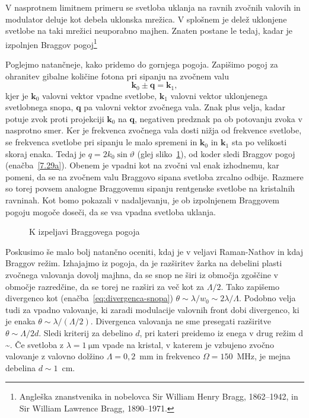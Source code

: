 V nasprotnem limitnem primeru se svetloba uklanja na ravnih zvočnih valovih in modulator deluje 
kot debela uklonska mrežica. V splošnem je delež uklonjene svetlobe na taki mrežici 
neuporabno majhen. 
Znaten postane le tedaj, kadar je izpolnjen Braggov
pogoj\footnote{Angleška znanstvenika in nobelovca Sir William Henry Bragg, 1862--1942,
in Sir William Lawrence Bragg, 1890--1971.}

Poglejmo natančneje, kako pridemo do gornjega pogoja. Zapišimo pogoj
za ohranitev gibalne količine fotona pri sipanju na zvočnem valu
\begin{equation}
\mathbf{k}_{0}\pm\mathbf{q}=\mathbf{k}_{1},
\label{7.30}
\end{equation}
kjer je $\mathbf{k}_{0}$ valovni vektor vpadne svetlobe, $\mathbf{k}_{1}$
valovni vektor uklonjenega svetlobnega snopa, $\mathbf{q}$ pa valovni
vektor zvočnega vala. Znak plus velja, kadar potuje zvok proti projekciji
$\mathbf{k}_{0}$ na $\mathbf{q}$, negativen predznak pa ob potovanju zvoka v nasprotno smer. 
Ker je frekvenca zvočnega vala dosti nižja od frekvence svetlobe, se frekvenca svetlobe 
pri sipanju le malo spremeni in $\mathbf{k}_{0}$ in $\mathbf{k}_{1}$ sta po velikosti skoraj enaka.
Tedaj je $q=2k_{0}\sin\vartheta$ (glej sliko~\ref{fig:ao_bragg3}), od koder sledi Braggov pogoj 
(enačba~\ref{7.29a}). Obenem je vpadni kot na zvočni val enak izhodnemu, kar pomeni, da se na
zvočnem valu Braggovo sipana svetloba zrcalno odbije. Razmere so torej
povsem analogne Braggovemu sipanju rentgenske svetlobe na kristalnih
ravninah. Kot bomo pokazali v nadaljevanju, je ob izpolnjenem Braggovem pogoju mogoče doseči, 
da se vsa vpadna svetloba uklanja.
\begin{figure}[h]
\centering
\def\svgwidth{40truemm} 

\caption{K izpeljavi Braggovega pogoja}
\label{fig:ao_bragg3}
\end{figure}
\begin{remark}
 Poskusimo še malo bolj natančno oceniti, kdaj je v veljavi Raman-Nathov in kdaj Braggov režim. 
Izhajajmo iz pogoja, da je razširitev žarka na debelini plasti zvočnega valovanja dovolj
 majhna, da se snop ne širi iz območja zgoščine v območje razredčine, da se torej ne razširi za 
 več kot za $\Lambda/2$. Tako zapišemo
 divergenco kot (enačba~\ref{eq:divergenca-snopa}) $\theta \sim \lambda/w_0 \sim 2\lambda/\Lambda$.
 Podobno velja tudi za vpadno valovanje, ki zaradi modulacije valovnih front dobi divergenco, 
 ki je enaka $\theta \sim \lambda/(\Lambda/2).$ Divergenca valovanja ne sme presegati 
 razširitve $\theta \sim \Lambda/2d$.
  Sledi kriterij za debelino $d$, pri kateri preidemo iz enega v drug režim
\beq
d \sim {}.
\eeq
Če svetloba z $\lambda = 1~\si{\micro\metre}$ vpade na kristal, v katerem je vzbujeno zvočno
valovanje z valovno dolžino $\Lambda = 0,2$~mm in frekvenco $\Omega = 150$~MHz, je mejna 
debelina $d \sim 1$~cm.
\end{remark}

